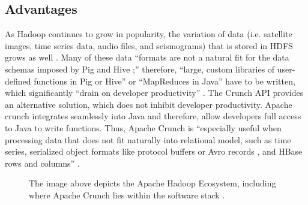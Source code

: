 \documentclass[9pt,twocolumn,twoside]{../../styles/osajnl}
\begin{document}
\subsection{Advantages}
As Hadoop continues to grow in popularity, the variation of data (i.e. satellite images, time series data, audio files, and seismograms) that is stored in HDFS \CE grows as well \cite{www-wills-crunch}. Many of these data ``formats are not a natural fit for the data schemas imposed by Pig \CE and Hive \CE;'' therefore, ``large, custom libraries of user-defined functions in Pig or Hive'' or ``MapReduces in Java'' have to be written, which significantly ``drain on developer productivity'' \cite{www-wills-crunch}. The Crunch API provides an alternative solution, which does not inhibit developer productivity. Apache crunch integrates seamlessly into Java and therefore, allow developers full access to Java to write functions. Thus, Apache Crunch is ``especially useful when processing data that does not fit naturally into relational model, such as time series, serialized object formats like protocol buffers or Avro records \CE , and HBase \CE rows and columns'' \cite{www-crunch-api}.

\begin{figure}[htbp]
\centering
{}
\caption{The image above depicts the Apache Hadoop Ecosystem, including where Apache Crunch lies within the software stack \cite{www-hadoop-ecosystem}.}
\label{fig:hadoop-ecosystem-and-components_3}
\end{figure}
\end{document}
